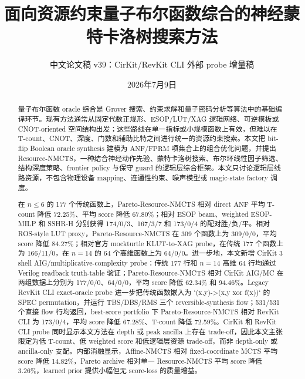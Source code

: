 \documentclass[UTF8,fontset=macnew,11pt]{ctexart}
\title{面向资源约束量子布尔函数综合的神经蒙特卡洛树搜索方法}
\author{中文论文稿 v39：CirKit/RevKit CLI 外部 probe 增量稿}
\date{2026年7月9日}
\newcommand{\method}{Resource-NMCTS}
\newcommand{\anf}{\ensuremath{\mathrm{ANF}}}
\newcommand{\fprm}{\ensuremath{\mathrm{FPRM}}}
\begin{document}
\pagestyle{plain}
\maketitle

\begin{abstract}
量子布尔函数 oracle 综合是 Grover 搜索、约束求解和量子密码分析等算法中的基础编译环节。现有方法通常从固定代数正规形、ESOP/LUT/XAG 逻辑网络、可逆模板或 CNOT-oriented 空间结构出发；这些路线在单一指标或小规模函数上有效，但难以在 T-count、CNOT、深度、门数和辅助比特之间进行统一的资源约束搜索。本文把 bit-flip Boolean oracle synthesis 建模为 \anf{}/\fprm{} 项集合上的组合优化问题，并提出 \method{}，一种结合神经动作先验、蒙特卡洛树搜索、布尔环线性因子筛选、结构深度策略、frontier policy 与保守 guard 的逻辑层综合框架。本文只讨论逻辑层线路资源，不包含物理设备 mapping、连通性约束、噪声模型或 magic-state factory 调度。

在 $n\leq6$ 的 177 个传统函数上，Pareto-\method{} 相对 direct \anf{} 平均 T-count 降低 72.25\%、平均 score 降低 67.80\%；相对 ESOP beam、weighted ESOP-MILP 和 SSHR-H 分别获得 174/0/3、167/3/7 和 173/0/4 的配对胜/负/平。相对 ROS-style LUT proxy，Pareto-\method{} 在 309 个函数上为 309/0/0，平均 score 降低 84.27\%；相对官方 mockturtle KLUT-to-XAG probe，在传统 177 个函数上为 166/11/0，在 $n=14$ 的 64 个高维函数上为 64/0/0。进一步地，本文新增 CirKit 3 shell AIG/multiplicative-complexity probe：传统 177 行和 $n=14$ 高维 64 行均通过 Verilog readback truth-table 验证；Pareto-\method{} 相对 CirKit AIG/MC 在两组数据上分别为 177/0/0、64/0/0，平均 score 降低 62.34\% 和 94.46\%。Legacy RevKit CLI exact-oracle probe 进一步把传统函数嵌入为 `(x,y)->(x,y xor f(x))` 的 SPEC permutation，并运行 TBS/DBS/RMS 三个 reversible-synthesis flow；531/531 个直接 flow 行均返回，best-score portfolio 下 Pareto-\method{} 相对 RevKit CLI 为 173/0/4，平均 score 降低 67.28\%、T-count 降低 72.59\%。CirKit 和 RevKit CLI probe 同时显示本文方法在 depth 或 peak ancilla 上存在 trade-off，因此本文主张限定为低 T-count、低 weighted score 和低逻辑层资源 trade-off，而非 depth-only 或 ancilla-only 支配。内部消融显示，Affine-NMCTS 相对 fixed-coordinate MCTS 平均 score 降低 14.82\%，Pareto archive 相对单一 \method{} 平均 score 降低 3.26\%，learned prior 提供小幅但无 score-loss 的质量增益。


\end{abstract}
\end{document}
